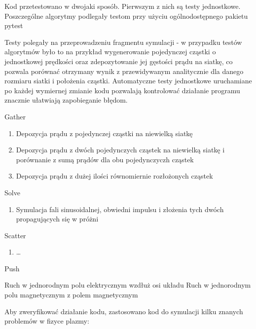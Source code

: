     Kod przetestowano w dwojaki sposób. Pierwszym z nich są testy jednostkowe.
    Poszczególne algorytmy podlegały testom przy użyciu ogólnodostępnego pakietu pytest 

    Testy polegały na przeprowadzeniu fragmentu symulacji - w przypadku testów algorytmów było to na przykład wygenerowanie
    pojedynczej cząstki o jednostkowej prędkości oraz zdepozytowanie jej gęstości prądu na siatkę, co pozwala porównać
    otrzymany wynik z przewidywanym analitycznie dla danego rozmiaru siatki i położenia cząstki. Automatyczne testy
    jednostkowe uruchamiane po każdej wymiernej zmianie kodu pozwalają kontrolować działanie programu znacznie ułatwiają
    zapobieganie błędom.

    \begin{enumerate}
        \itemi Gather
            \begin{enumerate}
                \item Depozycja prądu z pojedynczej cząstki na niewielką siatkę
                \item Depozycja prądu z dwóch pojedynczych cząstek na niewielką siatkę
                    i porównanie z sumą prądów dla obu pojedynczyczh cząstek
                \item Depozycja prądu z dużej ilości równomiernie rozłożonych cząstek
            \end{enumerate}

        \itemi Solve
            \begin{enumerate}
                \item Symulacja fali sinusoidalnej, obwiedni impulsu i złożenia tych dwóch
                    propagujących się w próżni
            \end{enumerate}

        \itemi Scatter
            \begin{enumerate}
                \item \ldots {}
            \end{enumerate}

        \itemi Push
            \begin{enumerate}
                \itemii Ruch w jednorodnym polu elektrycznym wzdłuż osi układu
                \itemii Ruch w jednorodnym polu magnetycznym z polem magnetycznym
            \end{enumerate}
    \end{enumerate}

    Aby zweryfikować działanie kodu, zastosowano kod do symulacji kilku znanych problemów w fizyce plazmy:
